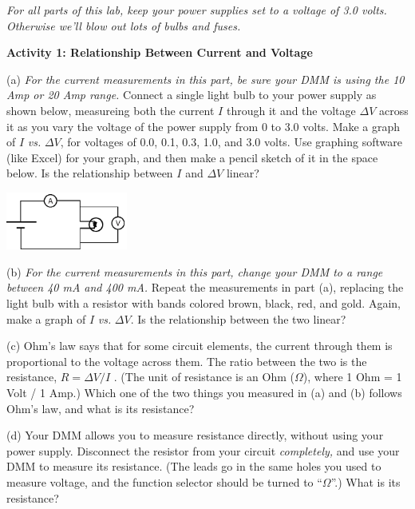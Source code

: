 \begin{newboxed}
\textit{For all parts of this lab, keep your power supplies set to a voltage of 3.0 volts.  Otherwise we'll blow out lots of bulbs and fuses.}
\end{newboxed}

\vspace{0.1 in}
\textbf{Activity 1: Relationship Between Current and Voltage}

(a) \textit{For the current measurements in this part, be sure your DMM is using the 10 Amp or 20 Amp range.} Connect a single light bulb to your power supply as shown below, measureing both the current $I$ through it and the voltage $\Delta V$ across it as you vary the voltage of the power supply from 0 to 3.0 volts.  Make a graph of $I$ \textit{vs.} $\Delta V$, for voltages of 0.0, 0.1, 0.3, 1.0, and 3.0 volts.  Use graphing software (like Excel) for your graph, and then make a pencil sketch of it in the space below.  Is the relationship between $I$ and $\Delta V$ linear?

\hspace{0.5in}\includegraphics[width=0.3\textwidth]{electric_circuits2/circ_diag1.eps}
\vspace{0.5 in}

(b) \textit{For the current measurements in this part, change your DMM to a range between 40 mA and 400 mA.} Repeat the measurements in part (a), replacing the light bulb with a resistor with bands colored brown, black, red, and gold.  Again, make a graph of $I$ \textit{vs.} $\Delta V$.  Is the relationship between the two linear?
\vspace{1.6 in}

\newpage
(c) Ohm's law says that for some circuit elements, the current through them is proportional to the voltage across them.  The ratio between the two is the resistance, $R=\Delta V / I$ .  (The unit of resistance is an Ohm ($\Omega$), where 1 Ohm = 1 Volt / 1 Amp.)  Which one of the two things you measured in (a) and (b) follows Ohm's law, and what is its resistance?
\vspace{0.7 in}

(d) Your DMM allows you to measure resistance directly, without using your power supply.  Disconnect the resistor from your circuit \textit{completely,} and use your DMM to measure its resistance.  (The leads go in the same holes you used to measure voltage, and the function selector should be turned to ``$\Omega$''.)  What is its resistance?
\vspace{0.5 in}

